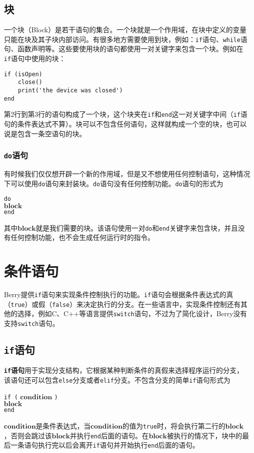 \subsection{块}

一个块（Block）是若干语句的集合。一个块就是一个作用域，在块中定义的变量只能在块及其子块内部访问。有很多地方需要使用到块，例如：\texttt{if}语句、\texttt{while}语句、函数声明等。这些要使用块的语句都使用一对关键字来包含一个块。例如在\texttt{if}语句中使用的块：
\begin{lstlisting}[language=berry]
if (isOpen)
    close()
    print('the device was closed')
end
\end{lstlisting}
第2行到第3行的语句构成了一个块，这个块夹在\texttt{if}和\texttt{end}这一对关键字中间（\texttt{if}语句的条件表达式不算）。块可以不包含任何语句，这样就构成一个空的块，也可以说是包含一条空语句的块。

\subsubsection{\texttt{do}语句}

有时候我们仅仅想开辟一个新的作用域，但是又不想使用任何控制语句，这种情况下可以使用\texttt{do}语句来封装块。\texttt{do}语句没有任何控制功能。\texttt{do}语句的形式为
\begin{algorithm}
    \texttt{do}\\
    \qquad $\bm{block}$ \\
    \texttt{end}
\end{algorithm}
其中$\bm{block}$就是我们需要的块。该语句使用一对\texttt{do}和\texttt{end}关键字来包含块，并且没有任何控制功能，也不会生成任何运行时的指令。

\section{条件语句}

Berry提供\texttt{if}语句来实现条件控制执行的功能。\texttt{if}语句会根据条件表达式的真（\texttt{true}）或假（\texttt{false}）来决定执行的分支。在一些语言中，实现条件控制还有其他的选择，例如C、C++等语言提供\texttt{switch}语句，不过为了简化设计，Berry没有支持\texttt{switch}语句。

\subsection{\texttt{if}语句}

\textbf{\texttt{if}语句}用于实现分支结构，它根据某种判断条件的真假来选择程序运行的分支，该语句还可以包含\texttt{else}分支或者\texttt{elif}分支。不包含分支的简单\texttt{if}语句形式为
\begin{algorithm}
    \texttt{if (} $\bm{condition}$ \texttt{)} \\
    \qquad $\bm{block}$ \\
    \texttt{end}
\end{algorithm}
$\bm{condition}$是条件表达式，当$\bm{condition}$的值为\texttt{true}时，将会执行第二行的$\bm{block}$，否则会跳过该$\bm{block}$并执行\texttt{end}后面的语句。在$\bm{block}$被执行的情况下，块中的最后一条语句执行完以后会离开\texttt{if}语句并开始执行\texttt{end}后面的语句。

